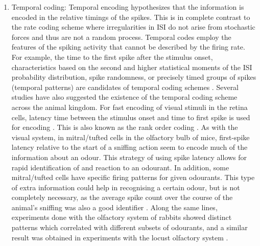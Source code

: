 \begin{enumerate}
	\item Temporal coding: Temporal encoding hypothesizes that the information is encoded in the relative timings of the spikes. This is in complete contrast to the rate coding scheme where irregularities in ISI do not arise from stochastic forces and thus are not a random process. Temporal codes employ the features of the spiking activity that cannot be described by the firing rate. For example, the time to the first spike after the stimulus onset, characteristics based on the second and higher statistical moments of the ISI probability distribution, spike randomness, or precisely timed groups of spikes (temporal patterns) are candidates of temporal coding schemes \citep{kostal2007neuronal}. Several studies have also suggested the existence of the temporal coding scheme across the animal kingdom. For fast encoding of visual stimuli in the retina cells, latency time between the stimulus onset and time to first spike is used for encoding \citep{gollisch2008rapid}. This is also known as the rank order coding \citep{van2001rate}. As with the visual system, in mitral/tufted cells in the olfactory bulb of mice, first-spike latency relative to the start of a sniffing action seem to encode much of the information about an odour. This strategy of using spike latency allows for rapid identification of and reaction to an odourant. In addition, some mitral/tufted cells have specific firing patterns for given odourants. This type of extra information could help in recognising a certain odour, but is not completely necessary, as the average spike count over the course of the animal's sniffing was also a good identifier \citep{wilson2008neural}. Along the same lines, experiments done with the olfactory system of rabbits showed distinct patterns which correlated with different subsets of odourants, and a similar result was obtained in experiments with the locust olfactory system \citep{theunissen1995temporal}.
\end{enumerate}


